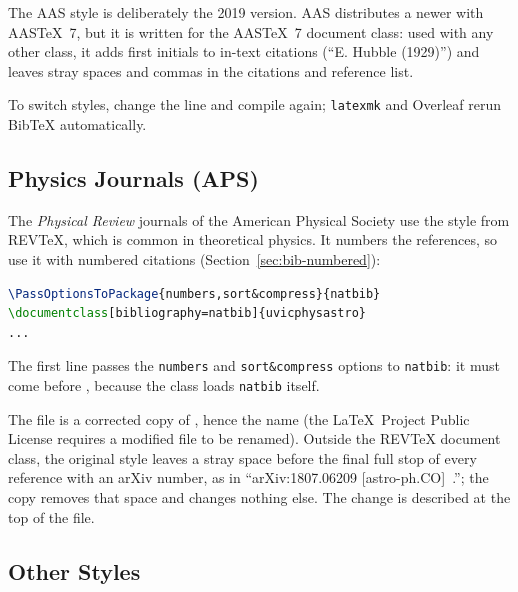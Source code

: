 The AAS style is deliberately the 2019 version. AAS distributes a newer  with AASTeX~7, but it is written for the AASTeX~7 document class: used with any other class, it adds first initials to in-text citations (``E. Hubble (1929)'') and leaves stray spaces and commas in the citations and reference list.

To switch styles, change the  line and compile again; \texttt{latexmk} and Overleaf rerun BibTeX automatically.

\subsection{Physics Journals (APS)}
\label{sec:bib-aps}

The \emph{Physical Review} journals of the American Physical Society use the style  from REVTeX, which is common in theoretical physics. It numbers the references, so use it with numbered citations (Section~\ref{sec:bib-numbered}):
\begin{lstlisting}[language=TeX]
\PassOptionsToPackage{numbers,sort&compress}{natbib}
\documentclass[bibliography=natbib]{uvicphysastro}
...


\end{lstlisting}
The first line passes the \texttt{numbers} and \texttt{sort\&compress} options to \texttt{natbib}: it must come before , because the class loads \texttt{natbib} itself.

The file is a corrected copy of , hence the name  (the \LaTeX\ Project Public License requires a modified file to be renamed). Outside the REVTeX document class, the original style leaves a stray space before the final full stop of every reference with an arXiv number, as in ``arXiv:1807.06209 [astro-ph.CO]~.''; the copy removes that space and changes nothing else. The change is described at the top of the file.

\subsection{Other Styles}

